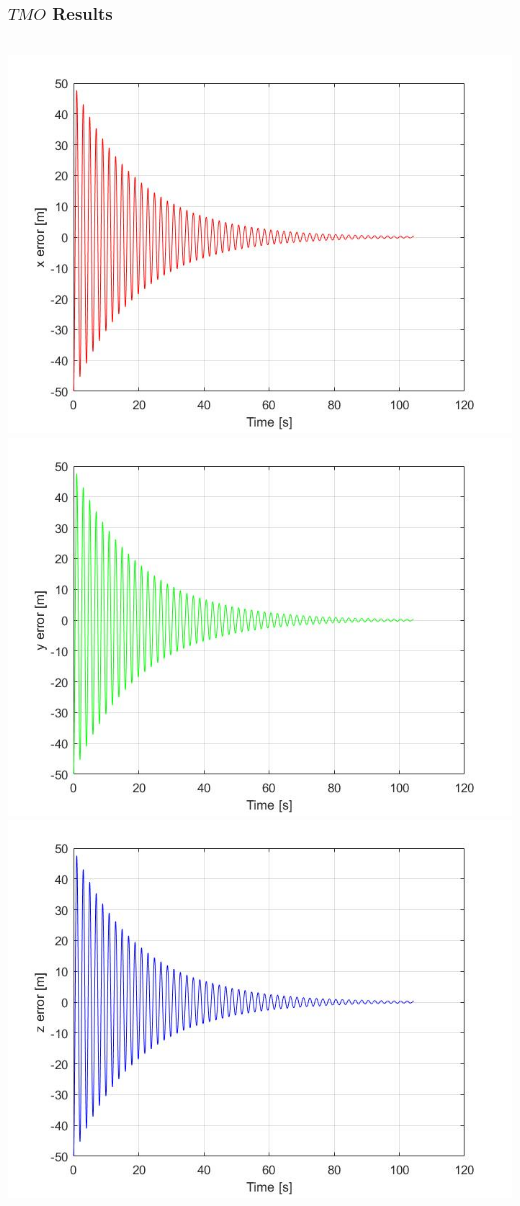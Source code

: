 \documentclass{beamer}
\begin{document}
	\begin{frame}
	\frametitle{$TMO$ Results}
		\begin{columns}[t]
			\centering
			\includegraphics[scale= 0.2]{nlo_x}\\
			\includegraphics[scale= 0.2]{nlo_y}
			\centering
			\includegraphics[scale= 0.2]{nlo_z}\\

\end{columns}
\end{frame}
\end{document}
